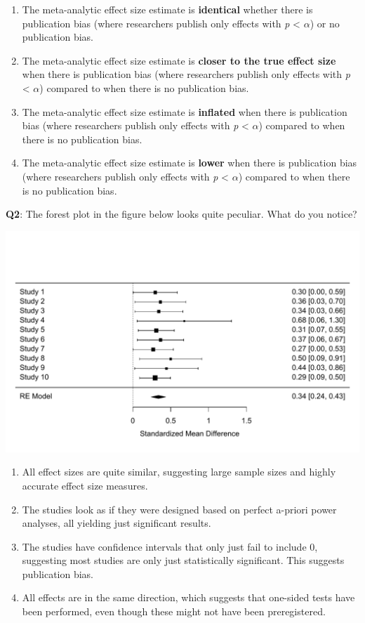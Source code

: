 \documentclass[
  oneside]{book}
\providecommand{\tightlist}{%
  \setlength{\itemsep}{0pt}\setlength{\parskip}{0pt}}
\begin{document}
\begin{enumerate}
\def\labelenumi{\Alph{enumi})}
\tightlist
\item
  The meta-analytic effect size estimate is \textbf{identical} whether there is
  publication bias (where researchers publish only effects with \emph{p} \textless{} \(\alpha\)) or no publication bias.
\item
  The meta-analytic effect size estimate is \textbf{closer to the true effect size} when there is publication bias (where researchers publish only effects with \emph{p} \textless{} \(\alpha\)) compared to when there is no publication bias.
\item
  The meta-analytic effect size estimate is \textbf{inflated} when there is publication bias (where researchers publish only effects with \emph{p} \textless{} \(\alpha\)) compared to when there is no publication bias.
\item
  The meta-analytic effect size estimate is \textbf{lower} when there is publication bias (where researchers publish only effects with \emph{p} \textless{} \(\alpha\)) compared to when there is no publication bias.
\end{enumerate}

\textbf{Q2}: The forest plot in the figure below looks quite peculiar. What do you notice?

\begin{center}\includegraphics[width=1\linewidth]{12-bias_files/figure-latex/metasimq2-1} \end{center}

\begin{enumerate}
\def\labelenumi{\Alph{enumi})}
\tightlist
\item
  All effect sizes are quite similar, suggesting large sample sizes and highly accurate effect size measures.
\item
  The studies look as if they were designed based on perfect a-priori power analyses, all yielding just significant results.
\item
  The studies have confidence intervals that only just fail to include 0, suggesting most studies are only just statistically significant. This suggests publication bias.
\item
  All effects are in the same direction, which suggests that one-sided tests have been performed, even though these might not have been preregistered.
\end{enumerate}
\end{document}
